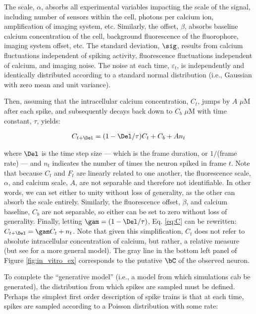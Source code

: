 \noindent The scale, $\alpha$, absorbs all experimental variables impacting the scale of the signal, including number of sensors within the cell, photons per calcium ion, amplification of imaging system, etc.  Similarly, the offset, $\beta$, absorbs baseline calcium concentration of the cell, background fluorescence of the fluorophore, imaging system offset, etc.  The standard deviation, $\sig$, results from calcium fluctuations independent of spiking activity, fluorescence fluctuations independent of calcium, and imaging noise. The noise at each time, $\varepsilon_t$, is independently and identically distributed according to a standard normal distribution (i.e., Gaussian with zero mean and unit variance). 

Then, assuming that the intracellular calcium concentration, $C_t$, jumps by $A$ $\mu$M after each spike, and subsequently decays back down to $C_b$ $\mu$M with time constant, $\tau$, yields:

\begin{align} \label{eq:C}
C_{t+\Del} = (1- \Del/\tau ) C_t + C_b + A n_t
\end{align}

\noindent where $\Del$ is the time step size --- which is the frame duration, or $1/$(frame rate) --- and $n_t$ indicates the number of times the neuron spiked in frame $t$. %
Note that because $C_t$ and $F_t$ are linearly related to one another, the fluorescence scale, $\alpha$, and calcium scale, $A$, are not separable and therefore not identifiable.  In other words, we can set either to unity without loss of generality, as the other can absorb the scale entirely.  Similarly, the fluorescence offset, $\beta$, and calcium baseline, $C_b$ are not separable, so either can be set to zero without loss of generality.  Finally, letting $\gam=(1-\Del/\tau)$, Eq. \eqref{eq:C} can be rewritten: $C_{t+\Del}=\gam C_t + n_t$. Note that given this simplification,  $C_t$ does not refer to absolute intracellular concentration of calcium, but rather, a relative measure (but see \cite{VogelsteinPaninski09} for a more general model).  The gray line in the bottom left panel of Figure \ref{fig:in_vitro_ex} corresponds to the putative $\bC$ of the observed neuron.  

To complete the ``generative model'' (i.e., a model from which simulations cab be generated), the distribution from which spikes are sampled must be defined.  Perhaps the simplest first order description of spike trains is that at each time, spikes are sampled according to a Poisson distribution with some rate:


